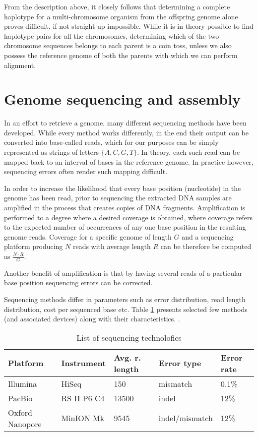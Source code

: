 From the description above, it closely follows that determining a complete haplotype for a multi-chromosome organism from the offspring genome alone proves difficult, if not straight up impossible. While it is in theory possible to find haplotype pairs for all the chromosomes, determining which of the two chromosome sequences belongs to each parent is a coin toss, unless we also possess the reference genome of both the parents with which we can perform alignment.

\section{Genome sequencing and assembly}

In an effort to retrieve a genome, many different sequencing methods have been developed. While every method works differently, in the end their output can be converted into base-called reads, which for our purposes can be simply represented as strings of letters $\{A, C, G, T\}$. In theory, each such read can be mapped back to an interval of bases in the reference genome. In practice however, sequencing errors often render such mapping difficult.

In order to increase the likelihood that every base position (nucleotide) in the genome has been read, prior to sequencing the extracted DNA samples are amplified in the process that creates copies of DNA fragments\cite{massung2005dna}. 
Amplification is performed to a degree where a desired coverage is obtained, where coverage refers to the expected number of occurrences of any one base position in the resulting genome reads.
Coverage for a specific genome of length $G$ and a sequencing platform producing $N$ reads with average length $R$ can be therefore be computed as $\frac{N \cdot R}{G}$. 

Another benefit of amplification is that by having several reads of a particular base position sequencing errors can be corrected.

Sequencing methods differ in parameters such as error distribution, read length distribution, cost per sequenced base etc. Table \ref{table:sequencing} presents selected few methods (and associated devices) along with their characteristics. \cite{kchouk2017generations}.

\begin{table}[]
\begin{tabular}{|l|l|l|l|l|}
\hline
\textbf{Platform} & \textbf{Instrument} & \textbf{Avg. r. length} & \textbf{Error type} & \textbf{Error rate} \\ \hline
Illumina          & HiSeq               & 150                      & mismatch            & 0.1\%                      \\ \hline
PacBio            & RS II P6 C4         & 13500                    & indel               & 12\%                       \\ \hline
Oxford Nanopore   & MinION Mk           & 9545                     & indel/mismatch      & 12\%                       \\ \hline
\end{tabular}
\caption{List of sequencing technolofies}
\label{table:sequencing}
\end{table}